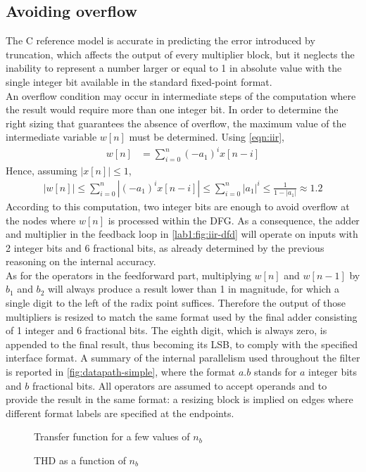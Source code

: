\subsection{Avoiding overflow}
The C reference model is accurate in predicting the error introduced by truncation, which affects the output of every multiplier block, but it neglects the inability to represent a number larger or equal to 1 in absolute value with the single integer bit available in the standard fixed-point format.\\
An overflow condition may occur in intermediate steps of the computation where the result would require more than one integer bit. In order to determine the right sizing that guarantees the absence of overflow, the maximum value of the intermediate variable $w[n]$ must be determined. Using \autoref{eqn:iir},
\begin{align*}
	w[n] &= \sum_{i=0}^{n} (-a_1)^i x[n-i]
\end{align*}
Hence, assuming $|x[n]|\leq 1$,
\begin{align*}
	|w[n]|\leq
	\sum_{i=0}^{n} |(-a_1)^i x[n-i]| \leq
	\sum_{i=0}^{n} |a_1|^i \leq
	\frac{1}{1-|a_1|} \approx
	1.2
\end{align*}
According to this computation, two integer bits are enough to avoid overflow at the nodes where $w[n]$ is processed within the DFG. As a consequence, the adder and multiplier in the feedback loop in \autoref{lab1:fig:iir-dfd} will operate on inputs with 2 integer bits and 6 fractional bits, as already determined by the previous reasoning on the internal accuracy.\\
As for the operators in the feedforward part, multiplying $w[n]$ and $w[n-1]$ by $b_1$ and $b_2$ will always produce a result lower than 1 in magnitude, for which a single digit to the left of the radix point suffices. Therefore the output of those multipliers is resized to match the same format used by the final adder consisting of 1 integer and 6 fractional bits. The eighth digit, which is always zero, is appended to the final result, thus becoming its LSB, to comply with the specified interface format. A summary of the internal parallelism used throughout the filter is reported in \autoref{fig:datapath-simple}, where the format $a.b$ stands for $a$ integer bits and $b$ fractional bits. All operators are assumed to accept operands and to provide the result in the same format: a resizing block is implied on edges where different format labels are specified at the endpoints.
\begin{figure}[htbp]
	\centering
	\caption{Transfer function for a few values of $n_b$}
	\label{fig:tfcomparison}
\end{figure}
\begin{figure}[htbp]
	\centering
	\caption{THD as a function of $n_b$}
	\label{fig:thdplot}
\end{figure}

